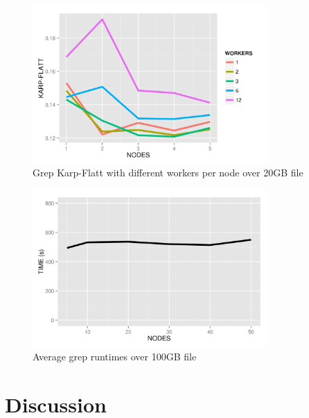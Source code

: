 \documentclass{article}
\begin{document}
    \begin{figure}[H]
        \centering
        \includegraphics[width=90mm]{images/workerPerNodeKarpFlatt.png}
        \caption{Grep Karp-Flatt with different workers per node over 20GB file}
        \label{fig:workNodeKF}
    \end{figure}


    \begin{figure}[H]
        \centering
        \includegraphics[width=90mm]{images/bigDataTimes.png}
        \caption{Average grep runtimes over 100GB file}
        \label{fig:bigTime}
    \end{figure}


\section{Discussion}
\end{document}

